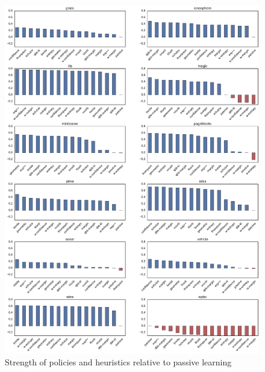 \documentclass[fleqn,10pt,lineno]{wlpeerj} %
\begin{document}
\begin{figure}[tbp]
	\centering
	\includegraphics[width=\textwidth]{figures/strengths}
	\caption[Policy strength]{Strength of policies and heuristics relative to
	passive learning}
	\label{fig:strengths}
\end{figure}
\end{document}
